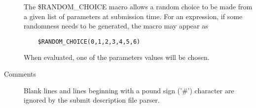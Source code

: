 \begin{description}
The \$RANDOM\_CHOICE macro allows a random choice to be made
from a given list of parameters at submission time.
For an expression, if some randomness needs to be generated,
the macro may appear as
\begin{verbatim} 
    $RANDOM_CHOICE(0,1,2,3,4,5,6)
\end{verbatim}
When evaluated, one of the parameters values will be chosen. 

\item[Comments] Blank lines and lines beginning with a 
pound sign
('\#')
character are ignored by the submit description file parser. 

\end{description}

